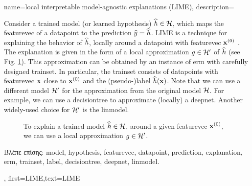 {name={local interpretable model-agnostic explanations (LIME)},
	description={Consider 
		a trained \gls{model} (or learned \gls{hypothesis}) $\widehat{h} \in \mathcal{H}$, 
		which maps the \gls{featurevec} of a \gls{datapoint} to the \gls{prediction} $\widehat{y}= \widehat{h}$. 
		LIME is a technique for explaining 
		the behavior of $\widehat{h}$, locally around a \gls{datapoint} with \gls{featurevec} ${\bf x}^{(0)}$ \cite{Ribeiro2016}. 
		The \gls{explanation} is given in the form of a local approximation $g \in \mathcal{H}'$ of $\widehat{h}$ (see Fig. \ref{fig_lime}). 
		This approximation can be obtained by an instance of \gls{erm} with carefully designed 
		\gls{trainset}. In particular, the \gls{trainset} consists of \gls{datapoint}s with 
		\gls{featurevec} ${\bf x}$ close to ${\bf x}^{(0)}$ and the (pseudo-)\gls{label} $\widehat{h}({\bf x})$. 
		Note that we can use a different \gls{model} $\mathcal{H}'$ for the approximation from 
		the original \gls{model} $\mathcal{H}$. For example, we can use a \gls{decisiontree} 
		to approximate (locally) a \gls{deepnet}. Another widely-used choice for $\mathcal{H}'$ is 
		the \gls{linmodel}. 
		\begin{figure}[H]
		\begin{center}
		\end{center}
		\caption{To explain a trained \gls{model} $\widehat{h} \in \mathcal{H}$, around a 
		given \gls{featurevec} ${\bf x}^{(0)}$, we can use a local approximation $g \in \mathcal{H}'$. }
		\label{fig_lime}
		\end{figure}
		\foreignlanguage{greek}{Βλέπε επίσης:} \gls{model}, \gls{hypothesis}, \gls{featurevec}, \gls{datapoint}, \gls{prediction}, \gls{explanation}, \gls{erm}, \gls{trainset}, \gls{label}, \gls{decisiontree}, \gls{deepnet}, \gls{linmodel}.},
	first={LIME},text={LIME}
}
	
